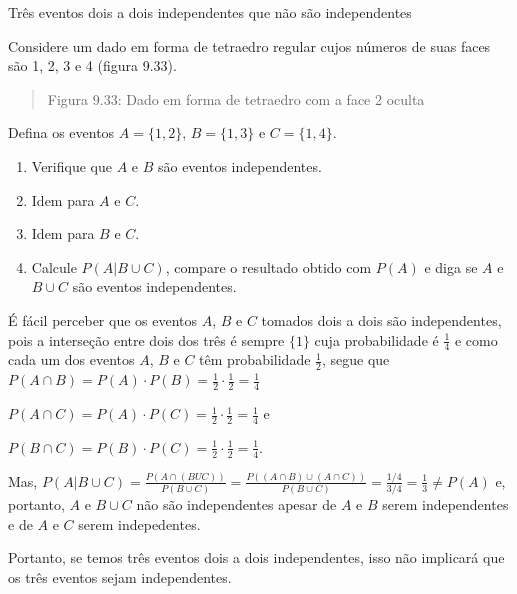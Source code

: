 \begin{example} {Três eventos dois a dois independentes que não são independentes}

Considere um dado em forma de tetraedro regular cujos números de suas faces são 1, 2, 3 e 4 (figura 9.33).
\begin{quote}
\label{\detokenize{PE511-7:id4}}
\begin{figure}[H]
\centering

\noindent{}
\label{\detokenize{PE511-7:id4}}\end{figure}

Figura 9.33: Dado em forma de tetraedro com a face 2 oculta
\end{quote}

Defina os eventos \(A=\{1,2\}\), \(B=\{1,3\}\) e \(C=\{1,4\}\).
\begin{enumerate}
\item {} 
Verifique que \(A\) e \(B\)  são eventos independentes.

\item {} 
Idem para \(A\) e \(C\).

\item {} 
Idem para \(B\) e \(C\).

\item {} 
Calcule \(P(A|B\cup C)\), compare o resultado obtido com \(P(A)\) e diga se \(A\) e \(B\cup C\) são eventos independentes.

\end{enumerate}

É fácil perceber que os eventos \(A\), \(B\) e \(C\) tomados dois a dois são independentes, pois a interseção entre dois dos três é sempre \(\{1\}\) cuja probabilidade é \(\frac{1}{4}\) e como cada um dos eventos \(A\), \(B\) e \(C\) têm probabilidade \(\frac{1}{2}\), segue que
\(P(A\cap B)=P(A)\cdot P(B)=\frac{1}{2}\cdot\frac{1}{2}=\frac{1}{4}\)

\(P(A\cap C)=P(A) \cdot P(C)=\frac{1}{2}\cdot\frac{1}{2}=\frac{1}{4}\) e

\(P(B\cap C)=P(B)\cdot P(C)=\frac{1}{2}\cdot\frac{1}{2}=\frac{1}{4}\).

Mas, \(P(A|B\cup C)=\frac{P(A\cap (BUC))}{P(B\cup C)}=\frac{P((A\cap B)\cup (A\cap C))}{P(B\cup C)}=\frac{1/4}{3/4}=\frac{1}{3}\neq P(A)\) e, portanto, \(A\) e \(B\cup C\)  não são independentes apesar de \(A\) e \(B\) serem independentes e de \(A\) e \(C\) serem indepedentes.

Portanto, se temos três eventos dois a dois independentes, isso não implicará que os três eventos sejam independentes.
\end{example}


